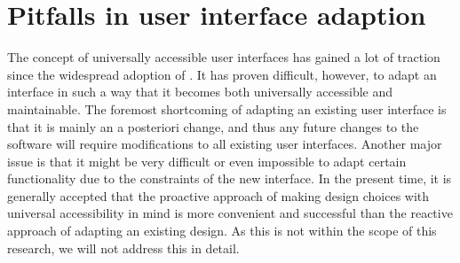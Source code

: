 \section{Pitfalls in user interface adaption}
\label{section:pitfallsinuserinterfaceadaption}
The concept of universally accessible user interfaces has gained a lot of traction since the widespread adoption of . It has proven difficult, however, to adapt an interface in such a way that it becomes both universally accessible and maintainable. The foremost shortcoming of adapting an existing user interface is that it is mainly an a posteriori change, and thus any future changes to the software will require modifications to all existing user interfaces. Another major issue is that it might be very difficult or even impossible to adapt certain functionality due to the constraints of the new interface\cite{emiliani2000adaptations}. In the present time, it is generally accepted that the proactive approach of making design choices with universal accessibility in mind is more convenient and successful than the reactive approach of adapting an existing design\cite{savidis2004unified}. As this is not within the scope of this research, we will not address this in detail.